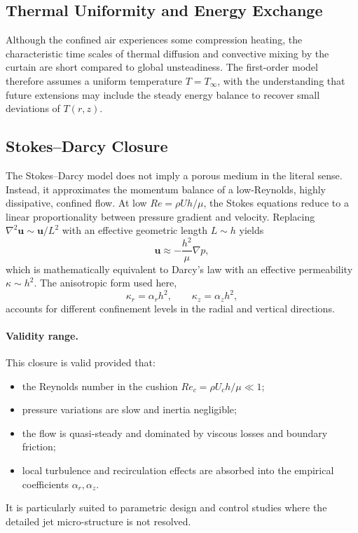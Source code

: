 \documentclass[11pt,a4paper]{article}
\begin{document}
\subsection{Thermal Uniformity and Energy Exchange}
Although the confined air experiences some compression heating, the characteristic time scales of thermal diffusion and convective mixing by the curtain are short compared to global unsteadiness.
The first-order model therefore assumes a uniform temperature $T=T_\infty$, with the understanding that future extensions may include the steady energy balance to recover small deviations of $T(r,z)$.

\subsection{Stokes--Darcy Closure}
The Stokes--Darcy model does not imply a porous medium in the literal sense.
Instead, it approximates the momentum balance of a low-Reynolds, highly dissipative, confined flow.
At low $Re=\rho U h/\mu$, the Stokes equations reduce to a linear proportionality between pressure gradient and velocity.
Replacing $\nabla^2\mathbf{u}\sim \mathbf{u}/L^2$ with an effective geometric length $L\sim h$ yields
\begin{equation}
  \mathbf{u}\approx-\frac{h^2}{\mu}\nabla p,
\end{equation}
which is mathematically equivalent to Darcy's law with an effective permeability $\kappa\sim h^2$.
The anisotropic form used here,
\begin{equation}
  \kappa_r=\alpha_r h^2,\qquad \kappa_z=\alpha_z h^2,
\end{equation}
accounts for different confinement levels in the radial and vertical directions.

\paragraph{Validity range.}
This closure is valid provided that:
\begin{itemize}
  \item the Reynolds number in the cushion $Re_c=\rho U_c h/\mu \ll 1$;
  \item pressure variations are slow and inertia negligible;
  \item the flow is quasi-steady and dominated by viscous losses and boundary friction;
  \item local turbulence and recirculation effects are absorbed into the empirical coefficients $\alpha_r,\alpha_z$.
\end{itemize}
It is particularly suited to parametric design and control studies where the detailed jet micro-structure is not resolved.
\end{document}
